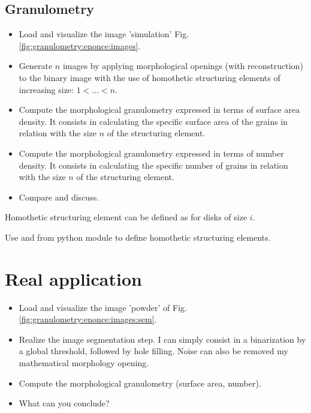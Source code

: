  
\subsection{Granulometry}
\begin{qbox}
\begin{itemize}
	\item Load and visualize the image 'simulation' Fig.\ref{fig:granulometry:enonce:images}.
	\item Generate $n$ images by applying morphological openings (with reconstruction) to the binary image with the use of homothetic structuring elements of increasing size: $1<\dots<n$.
	\item Compute the morphological granulometry expressed in terms of surface area density. It consists in calculating the specific surface area of the grains in relation with the size $n$ of the structuring element.
	\item Compute the morphological granulometry expressed in terms of number density. It consists in calculating the specific number of grains in relation with the size $n$ of the structuring element.
	\item Compare and discuss.
\end{itemize}
\end{qbox}

\begin{mcomment}
 \begin{mremark}
  Homothetic structuring element can be defined as  for disks of size $i$.
 \end{mremark}

\end{mcomment}

\begin{pcomment}
 \begin{premark}
  Use  and  from python module  to define homothetic structuring elements.
 \end{premark}

\end{pcomment}


\section{Real application}
\begin{qbox}
\begin{itemize}
	\item Load and visualize the image 'powder' of Fig. \ref{fig:granulometry:enonce:images:sem}.
	\item Realize the image segmentation step. I can simply consist in a binarization by a global threshold, followed by hole filling. Noise can also be removed my mathematical morphology opening.
	\item Compute the morphological granulometry (surface area, number).
	\item What can you conclude?
\end{itemize}
\end{qbox}

